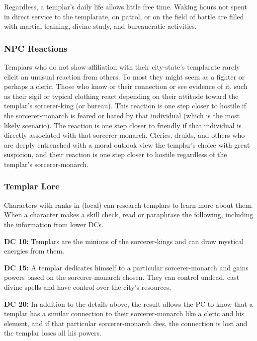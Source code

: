 Regardless, a templar's daily life allows little free time. Waking hours not spent in direct service to the templarate, on patrol, or on the field of battle are filled with martial training, divine study, and bureaucratic
activities.

\subsubsection{NPC Reactions}
Templars who do not show affiliation with their city-state's templarate rarely elicit an unusual reaction from others. To most they might seem as a fighter or perhaps a cleric. Those who know or their connection or see evidence of it, such as their sigil or typical clothing react depending on their attitude toward the templar's sorcerer-king (or bureau). This reaction is one step closer to hostile if the sorcerer-monarch is feared or hated by that individual (which is the most likely scenario). The reaction is one step closer to friendly if that individual is directly associated with that sorcerer-monarch. Clerics, druids, and others who are deeply entrenched with a moral outlook view the templar's choice with great suspicion, and their reaction is one step closer to hostile regardless of the templar's sorcerer-monarch.

\subsubsection{Templar Lore}
Characters with ranks in  (local) can research templars to learn more about them. When a character makes a skill check, read or paraphrase the following, including the information from lower DCs.

\textbf{DC 10:} Templars are the minions of the sorcerer-kings and can draw mystical energies from them.

\textbf{DC 15:} A templar dedicates himself to a particular sorcerer-monarch and gains powers based on the sorcerer-monarch chosen. They can control undead, cast divine spells and have control over the city's resources.

\textbf{DC 20:} In addition to the details above, the result allows the PC to know that a templar has a similar connection to their sorcerer-monarch like a cleric and his element, and if that particular sorcerer-monarch dies, the connection is lost and the templar loses all his powers.